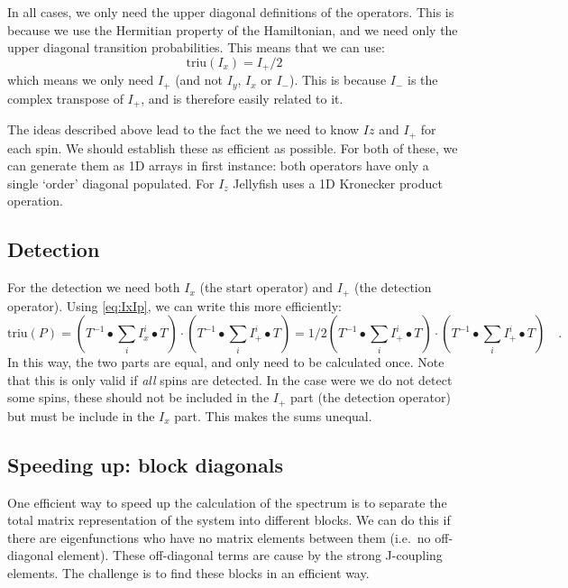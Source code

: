 \documentclass[11pt,a4paper]{article}
\begin{document}
In all cases, we only need the upper diagonal definitions of the operators. This is
because we use the Hermitian property of the Hamiltonian, and we need only the upper
diagonal transition probabilities. This means that we can use:
\begin{equation}
  \text{triu}(I_x) = I_+/2
  \label{eq:IxIp}
\end{equation}
which means we only need $I_+$ (and not $I_y$, $I_x$ or $I_-$). This is because $I_-$
is the complex transpose of $I_+$, and is therefore easily related to it.

The ideas described above lead to the fact the we need to know $Iz$ and $I_+$ for each
spin. We should establish these as efficient as possible. For both of these, we can
generate them as 1D arrays in first instance: both operators have only a single `order'
diagonal populated. For $I_z$ Jellyfish uses a 1D Kronecker product operation.


\subsection{Detection}
For the detection we need both $I_x$ (the start operator) and $I_+$ (the detection
operator). Using \autoref{eq:IxIp}, we can write this more efficiently:
\begin{equation}
  \text{triu}(P) = (T^{-1} \bullet \sum_i I_x^i \bullet T) \cdot (T^{-1} \bullet \sum_i I_+^i\bullet T)
  = 1/2 (T^{-1} \bullet \sum_i I_+^i\bullet T)\cdot (T^{-1} \bullet \sum_i I_+^i\bullet T) \quad .
\end{equation}
In this way, the two parts are equal, and only need to be calculated once.
Note that this is only valid if \textit{all} spins are detected. In the case were we do
not detect some spins, these should not be included in the $I_+$ part (the detection
operator) but must be include in the $I_x$ part. This makes the sums unequal.


\subsection{Speeding up: block diagonals}
One efficient way to speed up the calculation of the spectrum is to separate the total
matrix representation of the system into different blocks. We can do this if there are
eigenfunctions who have no matrix elements between them (i.e.\ no off-diagonal element).
These off-diagonal terms are cause by the strong J-coupling elements. The challenge is to
find these blocks in an efficient way.
\end{document}
